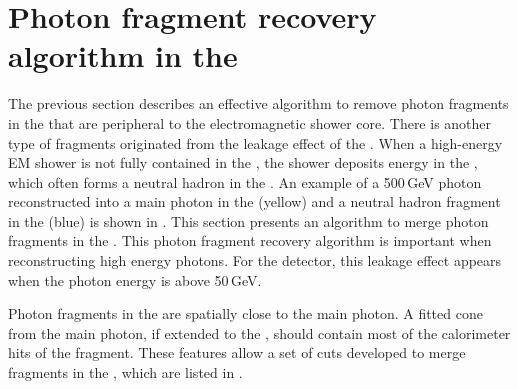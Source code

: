 \begin{table}[htbp]
\caption[The cuts for photon fragment removal algorithm in the \ECAL.]%
{The cuts for merging photon-photon-fragment pairs and photon-neutral-hadron-fragment pairs for both low energy and high energy fragments, immediately after photon reconstruction. $d$, $d_c$ and $d_h$ are the mean energy weighted intra-layer distance of the pair, the distance between centroids, the minimum distance between calorimeter hits of the pair, respectively. $E_m$ and $E_f$ are the main photon energy and the fragment energy, respectively. $E_{p1}$ and $E_{p2}$ are the energies the two largest peaks, found by peak finding algorithm, ordered by descending energy, respectively. $N_{calo}$ is the number of the calorimeter hits in the fragment.}
\label{tab:photonFragRemovalCuts2}
\end{table}
\section{Photon fragment recovery algorithm in the \HCAL}
\label{sec:photonHighEFragRemoval}

The previous section describes an effective algorithm to remove photon fragments in the \ECAL that are peripheral to the electromagnetic shower core. There is another type of fragments originated from the leakage effect of the \ECAL. When a high-energy EM shower is not fully contained in the \ECAL, the shower deposits energy in the \HCAL, which often forms a neutral hadron in the \HCAL. An example of a 500\,GeV photon reconstructed into a main photon in the \ECAL (yellow) and a neutral hadron fragment in the \HCAL (blue) is shown in . This section presents an algorithm to merge photon fragments in the \HCAL. This photon fragment recovery algorithm is important when reconstructing  high energy photons. For the \ILD detector, this \ECAL leakage effect appears when the photon energy is above 50\,GeV.


Photon fragments in the \HCAL are  spatially close to the main photon. A fitted cone from the main photon, if extended to the \HCAL, should contain most of the calorimeter hits of the fragment. These features allow a set of cuts developed to merge  fragments in the \HCAL, which are listed in .

